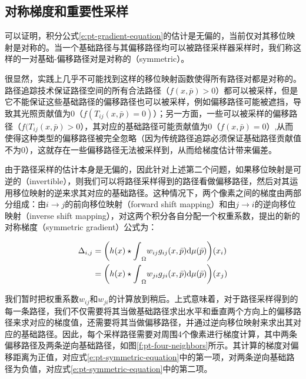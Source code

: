 \subsection{对称梯度和重要性采样}
可以证明，积分公式\ref{e:pt-gradient-equation}的估计是无偏的，当前仅对其移位映射是对称的。当一个基础路径与其偏移路径均可以被路径采样器采样时，我们称这样的一对基础-偏移路径对是对称的（symmetric）。

很显然，实践上几乎不可能找到这样的移位映射函数使得所有路径对都是对称的。路径追踪技术保证路径空间的所有合法路径（$f(x,\bar{p})>0$）都可以被采样，但是它不能保证这些基础路径的偏移路径也可以被采样，例如偏移路径可能被遮挡，导致其光照贡献值为0（$f(T_{ij}(x,\bar{p})=0)$）；另一方面，一些可以被采样的偏移路径（$f(T_{ij}(x,\bar{p})>0$），其对应的基础路径可能贡献值为0（$f(x,\bar{p})=0$）,从而使得这种类型的偏移路径被完全忽略（因为传统路径追踪必须保证基础路径贡献值不为0），这就存在一些偏移路径无法被采样到，从而给梯度估计带来偏差。

由于路径采样的估计本身是无偏的，因此针对上述第二个问题，如果移位映射是可逆的（invertible），则我们可以将路径采样得到的路径看做偏移路径，然后对其运用移位映射的逆来求其对应的基础路径。这种情况下，两个像素之间的梯度由两部分组成：由$i\to j$的前向移位映射（forward shift mapping）和由$j\to i$的逆向移位映射（inverse shift mapping），对这两个积分各自分配一个权重系数，\cite{a:ImprovedSamplingforGradientDomainMetropolisLightTransport}提出的新的对称梯度（symmetric gradient）公式为：

\begin{equation}\label{e:pt-symmetric-equation}
\begin{aligned}
	\Delta_{i,j}&=\bigg(h(x)\star{\rm \int}_\Omega w_{ij} g_{ij}(x, \bar{p}){\rm d}\mu(\bar{p}) \bigg)(x_i)\\
	&=\bigg(h(x)\star{\rm \int}_\Omega w_{ji} g_{ji}(x, \bar{p}){\rm d}\mu(\bar{p}) \bigg)(x_j)
\end{aligned}
\end{equation}

\noindent 我们暂时把权重系数$w_{ij}$和$w_{ji}$的计算放到稍后。上式意味着，对于路径采样得到的每一条路径，我们不仅需要将其当做基础路径求出水平和垂直两个方向上的偏移路径来求对应的梯度值，还需要将其当做偏移路径，并通过逆向移位映射来求出其对应的基础路径。因此，每个采样路径需要对周围4个像素进行梯度计算，其中两条偏移路径及两条逆向基础路径，如图\ref{f:pt-four-neighbors}所示。其计算的梯度对偏移距离为正值，对应式\ref{e:pt-symmetric-equation}中的第一项，对两条逆向基础路径为负值，对应式\ref{e:pt-symmetric-equation}中的第二项。

